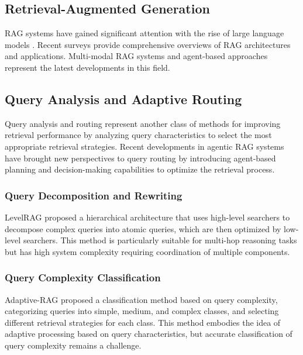 \documentclass[letterpaper]{article} %
\begin{document}
\subsection{Retrieval-Augmented Generation}

RAG systems have gained significant attention with the rise of large language models \cite{lewis2020retrieval}. Recent surveys \cite{gao2024retrieval} provide comprehensive overviews of RAG architectures and applications. Multi-modal RAG systems \cite{chen2022multimodal} and agent-based approaches \cite{singh2025agentic} represent the latest developments in this field.

\subsection{Query Analysis and Adaptive Routing}

Query analysis and routing represent another class of methods for improving retrieval performance by analyzing query characteristics to select the most appropriate retrieval strategies. Recent developments in agentic RAG systems \cite{singh2025agentic} have brought new perspectives to query routing by introducing agent-based planning and decision-making capabilities to optimize the retrieval process.

\subsubsection{Query Decomposition and Rewriting}

LevelRAG \cite{jiang2023levelrag} proposed a hierarchical architecture that uses high-level searchers to decompose complex queries into atomic queries, which are then optimized by low-level searchers. This method is particularly suitable for multi-hop reasoning tasks but has high system complexity requiring coordination of multiple components.

\subsubsection{Query Complexity Classification}

Adaptive-RAG \cite{jeong2024adaptive} proposed a classification method based on query complexity, categorizing queries into simple, medium, and complex classes, and selecting different retrieval strategies for each class. This method embodies the idea of adaptive processing based on query characteristics, but accurate classification of query complexity remains a challenge.
\end{document}
